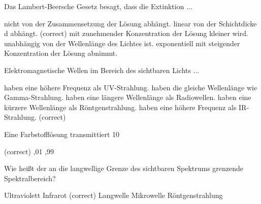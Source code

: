 \documentclass[11pt]{exam}
\begin{document}
\setlength{\voffset}{-0.5in}
\setlength{\headsep}{5pt}

\hspace{2mm}
 \hspace{5mm}
\vspace{4mm}

\begin{questions}

\question Das Lambert-Beersche Gesetz besagt, dass die Extinktion ...

\begin{choices}
	\choice nicht von der Zusammensetzung der Lösung abhängt.
	\choice linear von der Schichtdicke d abhängt. (correct)
	\choice mit zunehmender Konzentration der Lösung kleiner wird.
	\choice unabhängig von der Wellenlänge des Lichtes ist.
	\choice exponentiell mit steigender Konzentration der Lösung abnimmt.
\end{choices}

\vspace{3mm}\question Elektromagnetische Wellen im Bereich des sichtbaren Lichts ...

\begin{choices}
	\choice haben eine höhere Frequenz als UV-Strahlung.
	\choice haben die gleiche Wellenlänge wie Gamma-Strahlung.
	\choice haben eine längere Wellenlänge als Radiowellen.
	\choice haben eine kürzere Wellenlänge als Röntgenstrahlung.
	\choice haben eine höhere Frequenz als IR-Strahlung. (correct)
\end{choices}

\vspace{3mm}\question Eine Farbstofflösung transmittiert 10 %

\begin{choices}
	 (correct)
	,01
	,99
\end{choices}

\vspace{3mm}\question Wie heißt der an die langwellige Grenze des sichtbaren Spektrums grenzende Spektralbereich?

\begin{choices}
	\choice Ultraviolett
	\choice Infrarot (correct)
	\choice Langwelle
	\choice Mikrowelle
	\choice Röntgenstrahlung
\end{choices}


\end{questions}
\end{document}
